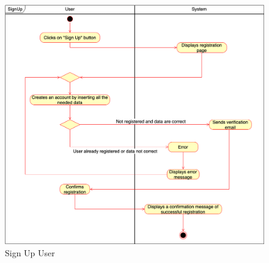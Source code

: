      
     \begin{figure}[h!]
        \centering
        \includegraphics[scale=0.35]{images/use_cases_diagram/user_sign_up.png}
        \caption{Sign Up  User}
        \label{fig:usr_sign_up}
    \end{figure}
     \FloatBarrier
     
